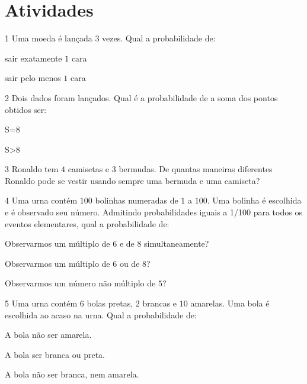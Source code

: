 \section{Atividades}

\num{1}  Uma moeda é lançada $3$ vezes. Qual a probabilidade de:

\begin{escolha}
\item sair exatamente $1$ cara 
\item sair pelo menos $1$ cara 
\end{escolha}

\num{2}  Dois dados foram lançados. Qual é a probabilidade de a soma dos
pontos obtidos ser:

\begin{escolha}
\item S=8 
\item S\textgreater8 
\end{escolha}

\num{3}  Ronaldo tem $4$ camisetas e $3$ bermudas. De quantas maneiras diferentes
Ronaldo pode se vestir usando sempre uma bermuda e uma camiseta?


\num{4}  Uma urna contém $100$ bolinhas numeradas de $1$ a $100$. Uma bolinha é
escolhida e é observado seu número. Admitindo probabilidades iguais a
1/100 para todos os eventos elementares, qual a probabilidade de:

\begin{escolha}
\item Observarmos um múltiplo de $6$ e de $8$ simultaneamente? 
\item Observarmos um múltiplo de $6$ ou de $8$? 
\item Observarmos um número não múltiplo de $5$? 
\end{escolha}

\num{5}  Uma urna contém $6$ bolas pretas, $2$ brancas e $10$ amarelas. Uma bola é
escolhida ao acaso na urna. Qual a probabilidade de:

\begin{escolha}
\item A bola não ser amarela. 
\item A bola ser branca ou preta. 
\item A bola não ser branca, nem amarela. 
\end{escolha}

